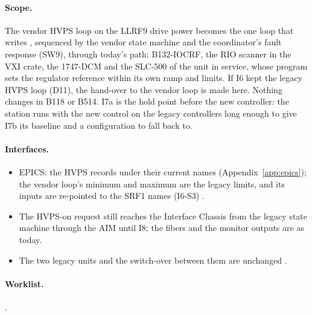 \paragraph{Scope.} The vendor HVPS loop on the LLRF9 drive power becomes the one loop
that writes , sequenced by the vendor state machine and the
coordinator's fault response (SW9), through today's path: \mbox{B132-IOCRF}, the RIO
scanner in the VXI crate, the 1747-DCM and the SLC-500 of the unit in service, whose
program sets the regulator reference within its own ramp and limits. If I6 kept the
legacy HVPS loop (D11), the hand-over to the vendor loop is made here. Nothing changes
in B118 or B514. I7a is the hold point before the new controller: the station runs
with the new control on the legacy controllers long enough to give I7b its baseline
and a configuration to fall back to.

\paragraph{Interfaces.}
\begin{itemize}
\item EPICS: the HVPS records under their current names
(Appendix~\ref*{app:epics}); the vendor loop's minimum and maximum are the legacy
limits, and its inputs are re-pointed to the SRF1 names (I6-S3) .
\item The HVPS-on request still reaches the Interface Chassis from the legacy state
machine through the AIM until I8; the fibers and the monitor outputs are as today.
\item The two legacy units and the switch-over between them are unchanged .
\end{itemize}

\paragraph{Worklist.} .

